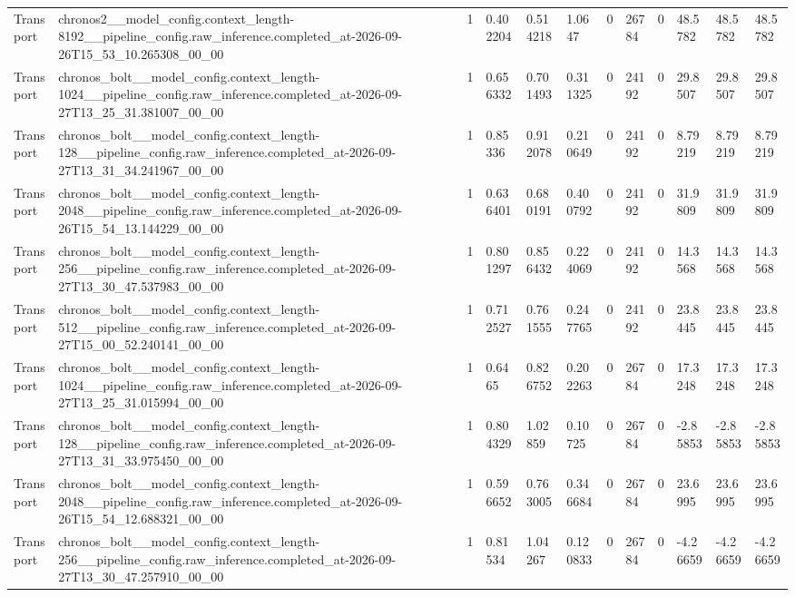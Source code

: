 \begin{tabular}{llllllllllll}
Transport & chronos2\_\_model\_config.context\_length-8192\_\_pipeline\_config.raw\_inference.completed\_at-2026-09-26T15\_53\_10.265308\_00\_00 & 1 & 0.402204 & 0.514218 & 1.0647 & 0 & 26784 & 0 & 48.5782 & 48.5782 & 48.5782 \\
Transport & chronos\_bolt\_\_model\_config.context\_length-1024\_\_pipeline\_config.raw\_inference.completed\_at-2026-09-27T13\_25\_31.381007\_00\_00 & 1 & 0.656332 & 0.701493 & 0.311325 & 0 & 24192 & 0 & 29.8507 & 29.8507 & 29.8507 \\
Transport & chronos\_bolt\_\_model\_config.context\_length-128\_\_pipeline\_config.raw\_inference.completed\_at-2026-09-27T13\_31\_34.241967\_00\_00 & 1 & 0.85336 & 0.912078 & 0.210649 & 0 & 24192 & 0 & 8.79219 & 8.79219 & 8.79219 \\
Transport & chronos\_bolt\_\_model\_config.context\_length-2048\_\_pipeline\_config.raw\_inference.completed\_at-2026-09-26T15\_54\_13.144229\_00\_00 & 1 & 0.636401 & 0.680191 & 0.400792 & 0 & 24192 & 0 & 31.9809 & 31.9809 & 31.9809 \\
Transport & chronos\_bolt\_\_model\_config.context\_length-256\_\_pipeline\_config.raw\_inference.completed\_at-2026-09-27T13\_30\_47.537983\_00\_00 & 1 & 0.801297 & 0.856432 & 0.224069 & 0 & 24192 & 0 & 14.3568 & 14.3568 & 14.3568 \\
Transport & chronos\_bolt\_\_model\_config.context\_length-512\_\_pipeline\_config.raw\_inference.completed\_at-2026-09-27T15\_00\_52.240141\_00\_00 & 1 & 0.712527 & 0.761555 & 0.247765 & 0 & 24192 & 0 & 23.8445 & 23.8445 & 23.8445 \\
Transport & chronos\_bolt\_\_model\_config.context\_length-1024\_\_pipeline\_config.raw\_inference.completed\_at-2026-09-27T13\_25\_31.015994\_00\_00 & 1 & 0.6465 & 0.826752 & 0.202263 & 0 & 26784 & 0 & 17.3248 & 17.3248 & 17.3248 \\
Transport & chronos\_bolt\_\_model\_config.context\_length-128\_\_pipeline\_config.raw\_inference.completed\_at-2026-09-27T13\_31\_33.975450\_00\_00 & 1 & 0.804329 & 1.02859 & 0.10725 & 0 & 26784 & 0 & -2.85853 & -2.85853 & -2.85853 \\
Transport & chronos\_bolt\_\_model\_config.context\_length-2048\_\_pipeline\_config.raw\_inference.completed\_at-2026-09-26T15\_54\_12.688321\_00\_00 & 1 & 0.596652 & 0.763005 & 0.346684 & 0 & 26784 & 0 & 23.6995 & 23.6995 & 23.6995 \\
Transport & chronos\_bolt\_\_model\_config.context\_length-256\_\_pipeline\_config.raw\_inference.completed\_at-2026-09-27T13\_30\_47.257910\_00\_00 & 1 & 0.81534 & 1.04267 & 0.120833 & 0 & 26784 & 0 & -4.26659 & -4.26659 & -4.26659 \\

\end{tabular}
